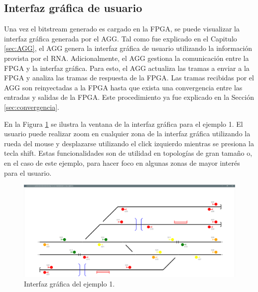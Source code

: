 \subsection{Interfaz gráfica de usuario}
	\label{sec:AGG_GUI}
		
	Una vez el bitstream generado es cargado en la FPGA, se puede visualizar la interfaz gráfica generada por el AGG. Tal como fue explicado en el Capitulo \ref{sec:AGG}, el AGG genera la interfaz gráfica de usuario utilizando la información provista por el RNA. Adicionalmente, el AGG gestiona la comunicación entre la FPGA y la interfaz gráfica. Para esto, el AGG actualiza las tramas a enviar a la FPGA y analiza las tramas de respuesta de la FPGA. Las tramas recibidas por el AGG son reinyectadas a la FPGA hasta que exista una convergencia entre las entradas y salidas de la FPGA. Este procedimiento ya fue explicado en la Sección \ref{sec:convergencia}.
		
	En la Figura \ref{fig:EJ1_AGG} se ilustra la ventana de la interfaz gráfica para el ejemplo 1. El usuario puede realizar zoom en cualquier zona de la interfaz gráfica utilizando la rueda del mouse y desplazarse utilizando el click izquierdo mientras se presiona la tecla shift. Estas funcionalidades son de utilidad en topologías de gran tamaño o, en el caso de este ejemplo, para hacer foco en algunas zonas de mayor interés para el usuario.
	
	\begin{figure}[H]
		\centering
		\includegraphics[origin = c, width=1\textwidth]{resultados-obtenidos/ejemplo1/images/AGG_S32_YES}
		\centering\caption{Interfaz gráfica del ejemplo 1.}
		\label{fig:EJ1_AGG}
	\end{figure}
	
